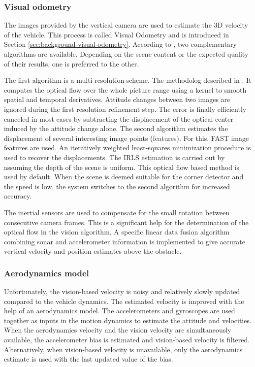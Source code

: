 \subsubsection{Visual odometry}
\label{sec:platform-visual-odometry}
The images provided by the vertical camera are used to estimate the 3D velocity of the vehicle.
This process is called Visual Odometry and is introduced in Section \ref{sec:background-visual-odometry}.
According to \cite{bristeau2011navigation}, two complementary algorithms are available.
Depending on the scene content or the expected quality of their results, one is preferred to the other.

The first algorithm is a multi-resolution scheme.
The methodolog described in \cite{lukas1981iterative}.
It computes the optical flow over the whole picture range using a kernel to smooth spatial and temporal derivatives.
Attitude changes between two images are ignored during the first resolution refinement step.
The error is finally efficiently canceled in most cases by subtracting the displacement of the optical center induced by the attitude change alone.
The second algorithm estimates the displacement of several interesting image points (features).
For this, FAST image features are used.
An iteratively weighted least-squares minimization procedure is used to recover the displacements.
The IRLS estimation \cite{michaelsen2004pose} is carried out by assuming the depth of the scene is uniform.
This optical flow based method is used by default.
When the scene is deemed suitable for the corner detector and the speed is low, the system switches to the second algorithm for increased accuracy.

The inertial sensors are used to compensate for the small rotation between consecutive camera frames.
This is a significant help for the determination of the optical flow in the vision algorithm.
A specific linear data fusion algorithm combining sonar and accelerometer information is implemented to give accurate vertical velocity and position estimates above the obstacle.

\subsubsection{Aerodynamics model}
Unfortunately, the vision-based velocity is noisy and relatively slowly updated compared to the vehicle dynamics.
The estimated velocity is improved with the help of an aerodynamics model.
The accelerometers and gyroscopes are used together as inputs in the motion dynamics to estimate the attitude and velocities.
When the aerodynamics velocity and the vision velocity are simultaneously available, the accelerometer bias is estimated and vision-based velocity is filtered.
Alternatively, when vision-based velocity is unavailable, only the aerodynamics estimate is used with the last updated value of the bias.

